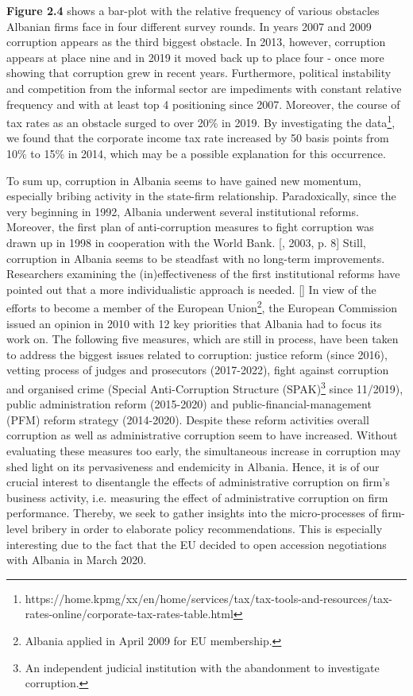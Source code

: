 \textbf{Figure 2.4} shows a bar-plot with the relative frequency of various obstacles Albanian firms face in four different survey rounds. In years 2007 and 2009 corruption appears as the third biggest obstacle. In 2013, however, corruption appears at place nine and in 2019 it moved back up to place four - once more showing that corruption grew in recent years. Furthermore, political instability and competition from the informal sector are impediments with constant relative frequency and with at least top 4 positioning since 2007. Moreover, the course of tax rates as an obstacle surged to over 20\% in 2019. By investigating the data\footnote{https://home.kpmg/xx/en/home/services/tax/tax-tools-and-resources/tax-rates-online/corporate-tax-rates-table.html}, we found that the corporate income tax rate increased by 50 basis points from 10\% to 15\% in 2014, which may be a possible explanation for this occurrence. 

To sum up, corruption in Albania seems to have gained new momentum, especially bribing activity in the state-firm relationship. Paradoxically, since the very beginning in 1992, Albania underwent several institutional reforms. Moreover, the first plan of anti-corruption measures to fight corruption was drawn up in 1998 in cooperation with the World Bank. [\citeauthor{mathisen2003donor}, 2003, p. 8] Still, corruption in Albania seems to be steadfast with no long-term improvements. Researchers examining the (in)effectiveness of the first institutional reforms have pointed out that a more individualistic approach is needed. [\citealp{tisne2004ground}] In view of the efforts to become a member of the European Union\footnote{Albania applied in April 2009 for EU membership.}, the European Commission issued an opinion in 2010 with 12 key priorities that Albania had to focus its work on. \citep{european2010communication} The following five measures, which are still in process, have been taken to address the biggest issues related to corruption: justice reform (since 2016), vetting process of judges and prosecutors (2017-2022), fight against corruption and organised crime (Special Anti-Corruption Structure (SPAK)\footnote{An independent judicial institution with the abandonment to investigate corruption.} since 11/2019), public administration reform (2015-2020) and public-financial-management (PFM) reform strategy (2014-2020). \citep{european2019communication}
Despite these reform activities overall corruption as well as administrative corruption seem to have increased. Without evaluating these measures too early, the simultaneous increase in corruption may shed light on its pervasiveness and endemicity in Albania. Hence, it is of our crucial interest to disentangle the effects of administrative corruption on firm's business activity, i.e. measuring the effect of administrative corruption on firm performance. Thereby, we seek to gather insights into the micro-processes of firm-level bribery in order to elaborate policy recommendations. This is especially interesting due to the fact that the EU decided to open accession negotiations with Albania in March 2020.


